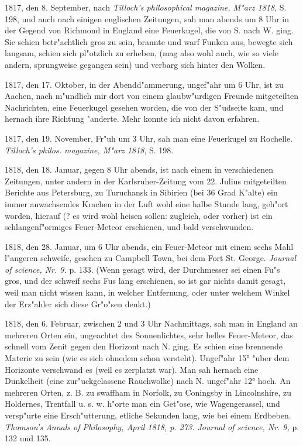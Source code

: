 \documentclass[a4paper, 11pt, oneside, polutonikogreek, german]{article}
\begin{document}
1817, den 8. September, nach \emph{Tilloch's philosophical magazine, M"arz 1818}, S. 198, und auch nach einigen englischen Zeitungen, sah man abends um 8 Uhr in der Gegend von Richmond in England eine Feuerkugel, die von S. nach W. ging. Sie schien betr"achtlich gros zu sein, brannte und warf Funken aus, bewegte sich langsam, schien sich pl"otzlich zu erheben, (mag also wohl auch, wie so viele andern, sprungweise gegangen sein) und verbarg sich hinter den Wolken.

1817, den 17. Oktober, in der Abendd"ammerung, ungef"ahr um 6 Uhr, ist zu Aachen, nach m"undlich mir dort von einem glaubw"urdigen Freunde mitgeteilten Nachrichten, eine Feuerkugel gesehen worden, die von der S"udseite kam, und hernach ihre Richtung "anderte. Mehr konnte ich nicht davon erfahren.

1817, den 19. November, Fr"uh um 3 Uhr, sah man eine Feuerkugel zu Rochelle. \emph{Tilloch's philos. magazine, M"arz 1818}, S. 198.

1818, den 18. Januar, gegen 8 Uhr abends, ist nach einem in verschiedenen Zeitungen, unter andern in der Karlsruher-Zeitung vom 22. Julius mitgeteilten Berichte aus Petersburg, zu Turuchansk in Sibirien (bei 36 Grad K"alte) ein immer anwachsendes Krachen in der Luft wohl eine halbe Stunde lang, geh"ort worden, hierauf (? es wird wohl heisen sollen: zugleich, oder vorher) ist ein schlangenf"ormiges Feuer-Meteor erschienen, und bald verschwunden.

1818, den 28. Januar, um 6 Uhr abends, ein Feuer-Meteor mit einem sechs Mahl l"angeren schweife, gesehen zu Campbell Town, bei dem Fort St. George. \emph{Journal of science, Nr. 9.} p. 133. (Wenn gesagt wird, der Durchmesser sei einen Fu"s gros, und der schweif sechs Fus lang erschienen, so ist gar nichts damit gesagt, weil man nicht wissen kann, in welcher Entfernung, oder unter welchem Winkel der Erz"ahler sich diese Gr"o"sen denkt.)

1818, den 6. Februar, zwischen 2 und 3 Uhr Nachmittags, sah man in England an mehreren Orten ein, ungeachtet des Sonnenlichtes, sehr helles Feuer-Meteor, das schnell vom Zenit gegen den Horizont nach N. ging. Es schien eine brennende Materie zu sein (wie es sich ohnedem schon versteht). Ungef"ahr 15° "uber dem Horizonte verschwand es (weil es zerplatzt war). Man sah hernach eine Dunkelheit (eine zur"uckgelassene Rauchwolke) nach N. ungef"ahr 12° hoch. An mehreren Orten, z. B. zu swaffham in Norfolk, zu Coningsby in Lincolnshire, zu Holdernes, Trentfall u. s. w. h"orte man ein Get"ose, wie Wagengerassel, und versp"urte eine Ersch"utterung, etliche Sekunden lang, wie bei einem Erdbeben. \emph{Thomson's Annals of Philosophy, April 1818, p. 273. Journal of science, Nr. 9,} p. 132 und 135.
\end{document}
